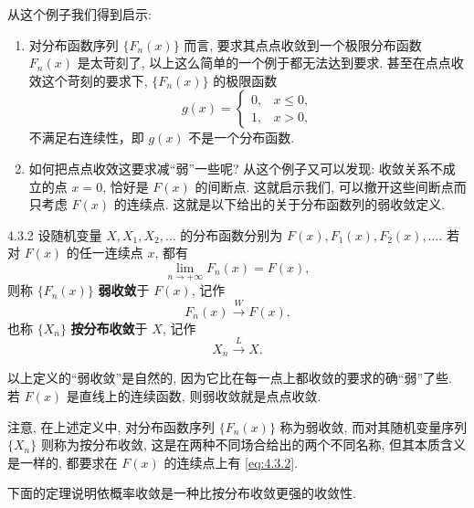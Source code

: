 从这个例子我们得到启示:
\begin{enumerate}
    \item 对分布函数序列 $ \{ F_n (x) \} $ 而言, 要求其点点收敛到一个极限分布函数 $ F_n (x) $ 是太苛刻了, 以上这么简单的一个例于都无法达到要求.
    甚至在点点收效这个苛刻的要求下, $ \{ F_n (x) \} $ 的极限函数
    \begin{equation*}
        g (x) =
        \begin{cases}
            0, & x \leq 0,\\
            1, & x > 0,
        \end{cases}
    \end{equation*}
    不满足右连续性，即 $ g (x) $ 不是一个分布函数.
    \item 如何把点点收效这要求减``弱''一些呢?
    从这个例子又可以发现: 收敛关系不成立的点 $ x=0 $, 恰好是 $ F (x) $ 的间断点.
    这就启示我们, 可以撤开这些间断点而只考虑 $ F (x) $ 的连续点.
    这就是以下给出的关于分布函数列的弱收敛定义.
\end{enumerate}

\begin{definition}{}{4.3.2}
    设随机变量 $ X, X_1,  X_2, \dotsc $  的分布函数分别为 $ F (x), F_1 (x), F_2 (x), \dotsc $.
    若对 $ F (x) $ 的任一连续点 $x$, 都有
    \begin{equation}\label{eq:4.3.2}
        \lim_{n \to +\infty} F_n (x) = F (x),
    \end{equation}
    则称 $ \{ F_n (x) \} $ \textbf{弱收敛}于 $ F (x) $, 记作
    \begin{equation}\label{eq:4.3.3}
        F_n (x) \stackrel{W}{\to} F (x).
    \end{equation}
    也称 $ \{ X_n \} $ \textbf{按分布收敛}于 $ X $, 记作
    \begin{equation}\label{eq:4.3.4}
        X_n \stackrel{L}{\to} X.
    \end{equation}
\end{definition}

以上定义的``弱收敛''是自然的, 因为它比在每一点上都收敛的要求的确``弱''了些.
若 $ F (x) $ 是直线上的连续函数, 则弱收敛就是点点收敛.

注意, 在上述定义中, 对分布函数序列 $ \{ F_n (x) \} $ 称为弱收敛, 而对其随机变量序列 $ \{ X_n \} $ 则称为按分布收敛, 这是在两种不同场合给出的两个不同名称, 但其本质含义是一样的, 都要求在 $ F (x) $ 的连续点上有 \eqref{eq:4.3.2}.

下面的定理说明依概率收敛是一种比按分布收敛更强的收敛性.

